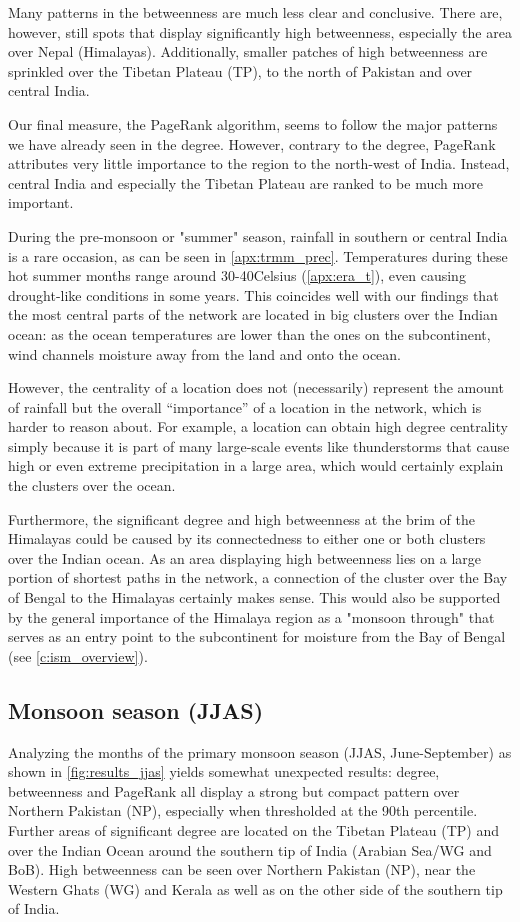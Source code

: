 Many patterns in the betweenness are much less clear and conclusive. There are, however, still spots that display significantly high betweenness, especially the area over Nepal (Himalayas). Additionally, smaller patches of high betweenness are sprinkled over the Tibetan Plateau (TP), to the north of Pakistan and over central India.

Our final measure, the PageRank algorithm, seems to follow the major patterns we have already seen in the degree. However, contrary to the degree, PageRank attributes very little importance to the region to the north-west of India. Instead, central India and especially the Tibetan Plateau are ranked to be much more important.

During the pre-monsoon or "summer" season, rainfall in southern or central India is a rare occasion, as can be seen in \cref{apx:trmm_prec}. Temperatures during these hot summer months range around 30-40\degree Celsius (\cref{apx:era_t}), even causing drought-like conditions in some years. This coincides well with our findings that the most central parts of the network are located in big clusters over the Indian ocean: as the ocean temperatures are lower than the ones on the subcontinent, wind channels moisture away from the land and onto the ocean.

However, the centrality of a location does not (necessarily) represent the amount of rainfall but the overall ``importance'' of a location in the network, which is harder to reason about. For example, a location can obtain high degree centrality simply because it is part of many large-scale events like thunderstorms that cause high or even extreme precipitation in a large area, which would certainly explain the clusters over the ocean.

Furthermore, the significant degree and high betweenness at the brim of the Himalayas could be caused by its connectedness to either one or both clusters over the Indian ocean. As an area displaying high betweenness lies on a large portion of shortest paths in the network, a connection of the cluster over the Bay of Bengal to the Himalayas certainly makes sense. This would also be supported by the general importance of the Himalaya region as a "monsoon through" that serves as an entry point to the subcontinent for moisture from the Bay of Bengal (see \cref{c:ism_overview}).

\subsection{Monsoon season (JJAS)}
Analyzing the months of the primary monsoon season (JJAS, June-September) as shown in \cref{fig:results_jjas} yields somewhat unexpected results: degree, betweenness and PageRank all display a strong but compact pattern over Northern Pakistan (NP), especially when thresholded at the 90th percentile. Further areas of significant degree are located on the Tibetan Plateau (TP) and over the Indian Ocean around the southern tip of India (Arabian Sea/WG and BoB). High betweenness can be seen over Northern Pakistan (NP), near the Western Ghats (WG) and Kerala as well as on the other side of the southern tip of India.

